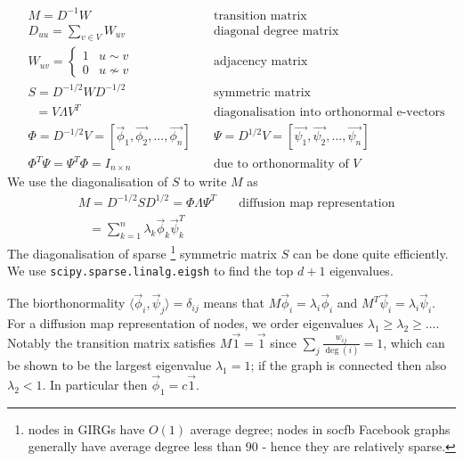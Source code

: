\begin{align*}
  & M = D^{-1}W \quad & \text{transition matrix}\\
  & D_{uu} = \sum_{v\in V} W_{uv} \quad & \text{diagonal degree matrix}\\
  & W_{uv} = \begin{cases}1 & u \sim v \\0 & u \nsim v \end{cases} \quad & \text{adjacency matrix}
  \\
  & S = D^{-1/2} W D^{-1/2} \quad & \text{symmetric matrix}\\
  & \;\; = V \Lambda V^T \quad & \text{diagonalisation into orthonormal e-vectors}\\
  & \Phi = D^{-1/2} V = [\vec{\phi}_1, \vec{\phi_2}, ..., \vec{\phi_n}] \quad & \Psi = D^{1/2} V = [\vec{\psi_1}, \vec{\psi_2}, ..., \vec{\psi_n}]\\
  & \Phi^T \Psi = \Psi^T \Phi = I_{n \times n} \quad & \text{due to orthonormality of $V$}
\end{align*}
%
We use the diagonalisation of $S$ to write $M$ as 
\begin{align*}
  & M = D^{-1/2} S D^{1/2} = \Phi \Lambda \Psi^T \quad & \text{diffusion map representation}\\
  & \;\;\; = \sum_{k=1}^n \lambda_k \vec{\phi}_k \vec{\psi}_k^T &
\end{align*}
%
The diagonalisation of sparse
\footnote{nodes in GIRGs have $O(1)$ average degree; nodes in socfb Facebook graphs generally have average degree less than $90$ - hence they are relatively sparse.}
symmetric matrix $S$ can be done quite efficiently.
We use \verb+scipy.sparse.linalg.eigsh+ to find the top $d+1$ eigenvalues.

The biorthonormality $\langle \vec{\phi}_i, \vec{\psi}_j \rangle = \delta_{ij}$ means that $M \vec{\phi}_i = \lambda_i \vec{\phi}_i$ and $M^T \vec{\psi}_i = \lambda_i \vec{\psi}_i$. For a diffusion map representation of nodes, we order eigenvalues $\lambda_1 \geq \lambda_2 \geq ...$.
Notably the transition matrix satisfies $M\vec{1} = \vec{1}$ since $\sum_j \frac{w_{ij}}{\deg(i)} = 1$, which can be shown to be the largest eigenvalue $\lambda_1=1$; if the graph is connected then also $\lambda_2 < 1$. In particular then $\vec{\phi}_1 = c \vec{1}$.

